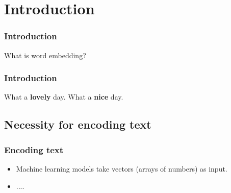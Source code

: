 \section{Introduction}

\begin{frame}
	\frametitle{Introduction}
	
	\begin{center}
		\Huge {What is word embedding?}
	\end{center}
\end{frame}



\begin{frame}
\frametitle{Introduction}


\huge {What a \textbf{lovely} day.}
\newline
\huge{What a \textbf{nice} day.}

\end{frame}


\subsection{Necessity for encoding text}


\begin{frame}
\frametitle{Encoding text}


	\begin{itemize}
	\item Machine learning models take vectors (arrays of numbers) as input.
	\item ....
\end{itemize}

\end{frame}




